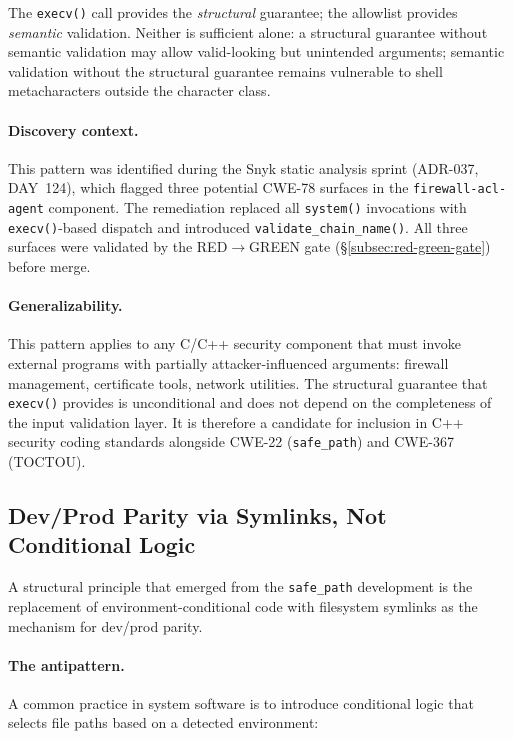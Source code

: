 \documentclass[11pt,a4paper]{article}
\begin{document}
    The \texttt{execv()} call provides the \emph{structural} guarantee; the allowlist
    provides \emph{semantic} validation. Neither is sufficient alone: a structural guarantee
    without semantic validation may allow valid-looking but unintended arguments;
    semantic validation without the structural guarantee remains vulnerable to shell
    metacharacters outside the character class.

    \paragraph{Discovery context.}
    This pattern was identified during the Snyk static analysis sprint (ADR-037, DAY~124),
    which flagged three potential CWE-78 surfaces in the \texttt{firewall-acl-agent}
    component. The remediation replaced all \texttt{system()} invocations with
    \texttt{execv()}-based dispatch and introduced \texttt{validate\_chain\_name()}.
    All three surfaces were validated by the RED$\to$GREEN gate
    (\S\ref{subsec:red-green-gate}) before merge.

    \paragraph{Generalizability.}
    This pattern applies to any C/C++ security component that must invoke external
    programs with partially attacker-influenced arguments: firewall management,
    certificate tools, network utilities. The structural guarantee that
    \texttt{execv()} provides is unconditional and does not depend on the
    completeness of the input validation layer. It is therefore a candidate for
    inclusion in C++ security coding standards alongside CWE-22 (\texttt{safe\_path})
    and CWE-367 (TOCTOU).

    \subsection{Dev/Prod Parity via Symlinks, Not Conditional Logic}
    \label{subsec:dev-prod-parity}

    A structural principle that emerged from the \texttt{safe\_path} development is the
    replacement of environment-conditional code with filesystem symlinks as the mechanism
    for dev/prod parity.

    \paragraph{The antipattern.}
    A common practice in system software is to introduce conditional logic that selects
    file paths based on a detected environment:
\end{document}
